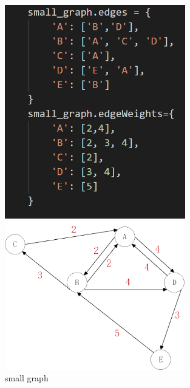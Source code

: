 \documentclass[aps,letterpaper,10pt]{revtex4}
\begin{document}
\begin{figure}[h]
	\begin{minipage}[c]{0.4\textwidth} %
		\centering
		\includegraphics[width=0.7\textwidth]{small_graph_UCS.png} %
	\end{minipage}%
	\begin{minipage}[c]{0.4\textwidth} %
		\centering
		\includegraphics[width=0.7\textwidth]{small_graph_UCS_visual.png} %
		
	\end{minipage}%
	\caption{small graph}
\end{figure}
\end{document}
